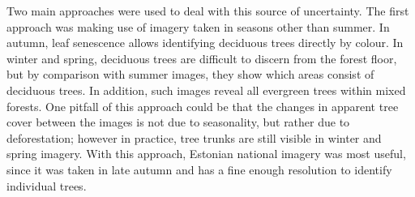 \documentclass[a4paper,12pt]{scrbook}
\begin{document}
Two main approaches were used to deal with this source of uncertainty. The first approach was making use of imagery taken in seasons other than summer. In autumn, leaf senescence allows identifying deciduous trees directly by colour. In winter and spring, deciduous trees are difficult to discern from the forest floor, but by comparison with summer images, they show which areas consist of deciduous trees. In addition, such images reveal all evergreen trees within mixed forests. One pitfall of this approach could be that the changes in apparent tree cover between the images is not due to seasonality, but rather due to deforestation; however in practice, tree trunks are still visible in winter and spring imagery. With this approach, Estonian national imagery was most useful, since it was taken in late autumn and has a fine enough resolution to identify individual trees.
\end{document}
